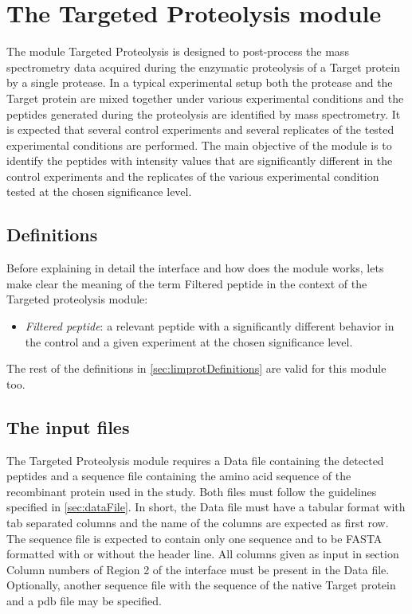 \chapter{The Targeted Proteolysis module}
\label{chap:tarprot}

The module Targeted Proteolysis is designed to post-process the mass spectrometry data acquired during the enzymatic proteolysis of a Target protein by a single protease. In a typical experimental setup both the protease and the Target protein are mixed together under various experimental conditions and the peptides generated during the proteolysis are identified by mass spectrometry. It is expected that several control experiments and several replicates of the tested experimental conditions are performed. The main objective of the module is to identify the peptides with intensity values that are significantly different in the control experiments and the replicates of the various experimental condition tested at the chosen significance level. 

\section{Definitions}

Before explaining in detail the interface and how does the module works, lets make clear the meaning of the term Filtered peptide in the context of the Targeted proteolysis module:

\begin{itemize}
	\item \textit{Filtered peptide}: a relevant peptide with a significantly different behavior in the control and a given experiment at the chosen significance level.\label{par:tarprotPIP}
\end{itemize}

The rest of the definitions in \autoref{sec:limprotDefinitions} are valid for this module too.

\section{The input files}

The Targeted Proteolysis module requires a Data file containing the detected peptides and a sequence file containing the amino acid sequence of the recombinant protein used in the study. Both files must follow the guidelines specified in \autoref{sec:dataFile}. In short, the Data file must have a tabular format with tab separated columns and the name of the columns are expected as first row. The sequence file is expected to contain only one sequence and to be FASTA formatted with or without the header line. All columns given as input in section Column numbers of Region \num{2} of the interface must be present in the Data file. Optionally, another sequence file with the sequence of the native Target protein and a pdb file may be specified.

